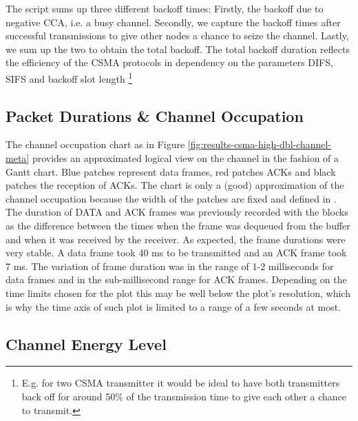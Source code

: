The script  sums up three different backoff times: Firstly, the backoff due to negative CCA, i.e. a busy channel. Secondly, we capture the backoff times after successful transmissions to give other nodes a chance to seize the channel. Lastly, we sum up the two to obtain the total backoff. The total backoff duration reflects the efficiency of the CSMA protocols in dependency on the parameters DIFS, SIFS and backoff slot length \footnote{E.g. for two CSMA transmitter it would be ideal to have both transmitters back off for around 50\% of the transmission time to give each other a chance to transmit.}

\subsection{Packet Durations \& Channel Occupation}

The channel occupation chart as in Figure \ref{fig:results-csma-high-dbl-channel-meta} provides an approximated logical view on the channel in the fashion of a Gantt chart. Blue patches represent data frames, red patches ACKs and black patches the reception of ACKs. The chart is only a (good) approximation of the channel occupation because the width of the patches are fixed and defined in . The duration of DATA and ACK frames was previously recorded with the  blocks as the difference between the times when the frame was dequeued from the buffer and when it was received by the receiver. As expected, the frame durations were very stable. A data frame took 40 ms to be transmitted and an ACK frame took 7 ms. The variation of frame duration was in the range of 1-2  milliseconds for data frames and in the sub-millisecond range for ACK frames. Depending on the time limits chosen for the plot this may be well below the plot's resolution, which is why the time axis of such plot is limited to a range of a few seconds at most.

\subsection{Channel Energy Level}

